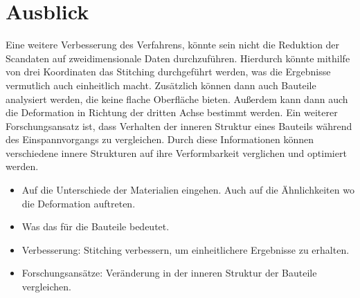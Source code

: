 \section{Ausblick}

Eine weitere Verbesserung des Verfahrens, könnte sein nicht die Reduktion der 
Scandaten auf zweidimensionale Daten durchzuführen. 
Hierdurch könnte mithilfe von drei Koordinaten das Stitching durchgeführt werden, 
was die Ergebnisse vermutlich auch einheitlich macht. Zusätzlich können 
dann auch Bauteile analysiert werden, die keine flache Oberfläche bieten.
Außerdem kann dann auch die Deformation in Richtung der dritten Achse bestimmt werden. 
Ein weiterer Forschungsansatz ist, dass Verhalten der inneren Struktur eines Bauteils 
während des Einspannvorgangs zu vergleichen. Durch diese Informationen können 
verschiedene innere Strukturen auf ihre Verformbarkeit verglichen und optimiert werden. 


\begin{itemize}
    \item Auf die Unterschiede der Materialien eingehen. Auch auf die Ähnlichkeiten 
    wo die Deformation auftreten.
    \item Was das für die Bauteile bedeutet.
    \item Verbesserung: Stitching verbessern, um einheitlichere Ergebnisse zu erhalten.
    \item Forschungsansätze: Veränderung in der inneren Struktur der Bauteile 
    vergleichen.
\end{itemize}
